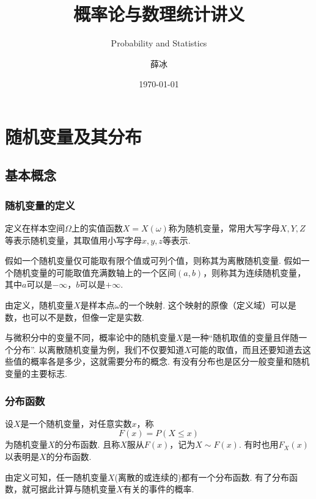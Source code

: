 \documentclass[lang=cn,10pt]{elegantbook}
\title{概率论与数理统计讲义}
\subtitle{Probability and Statistics}
\author{薛冰}
\date{\today}
\begin{document}
	\maketitle
	
	\frontmatter
	\tableofcontents
	\mainmatter


\newpage

\chapter{随机变量及其分布}
\section{基本概念}
\subsection{随机变量的定义}
\begin{definition}[随机变量]
	定义在样本空间$\varOmega$上的实值函数$X=X(\omega)$称为{\heiti 随机变量}，常用大写字母$X,Y,Z$等表示随机变量，其取值用小写字母$x,y,z$等表示.
	
	假如一个随机变量仅可能取有限个值或可列个值，则称其为{\heiti 离散随机变量}. 假如一个随机变量的可能取值充满数轴上的一个区间$(a,b)$，则称其为{\heiti 连续随机变量}，其中$a$可以是$-\infty$，$b$可以是$+\infty$.
\end{definition}
由定义，随机变量$X$是样本点$\omega$的一个映射. 这个映射的原像（定义域）可以是数，也可以不是数，但像一定是实数.

与微积分中的变量不同，概率论中的随机变量$X$是一种“随机取值的变量且伴随一个分布”. 以离散随机变量为例，我们不仅要知道$X$可能的取值，而且还要知道去这些值的概率各是多少，这就需要分布的概念. 有没有分布也是区分一般变量和随机变量的主要标志.
\subsection{分布函数}
\begin{definition}[分布函数]
	设$X$是一个随机变量，对任意实数$x$，称
	$$F(x)=P(X\leqslant x)$$
	为随机变量$X$的{\heiti 分布函数}. 且称$X$服从$F(x)$，记为$X\sim F(x)$. 有时也用$F_X(x)$以表明是$X$的分布函数.
\end{definition}
由定义可知，{\heiti 任一随机变量$X$(离散的或连续的)都有一个分布函数}. 有了分布函数，就可据此计算与随机变量$X$有关的事件的概率.
\end{document}
